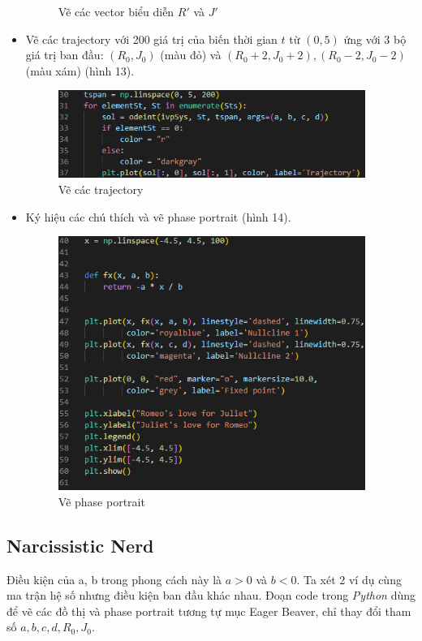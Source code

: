 \begin{itemize}
\begin{figure}[h!]
\begin{center}
        \end{center}
        \caption{Vẽ các vector biểu diễn $R'$ và $J'$}
    \end{figure}
    \item Vẽ các trajectory với 200 giá trị của biến thời gian $t$ từ $(0, 5)$ ứng với 3 bộ giá trị ban đầu: $(R_0, J_0)$ (màu đỏ) và $(R_0 + 2, J_0 + 2), (R_0 - 2, J_0 - 2)$ (màu xám) (hình 13).
    \begin{figure}[h!]
        \begin{center}
        \includegraphics[width=10cm]{images/plot_odeint.png}
        \end{center}
        \caption{Vẽ các trajectory}
    \end{figure}
    \item Ký hiệu các chú thích và vẽ phase portrait (hình 14).
    \begin{figure}[h!]
        \begin{center}
        \includegraphics[width=10cm]{images/phase_portrait.png}
        \end{center}
        \caption{Vẽ phase portrait}
    \end{figure}
\end{itemize}
\subsection{Narcissistic Nerd}
Điều kiện của a, b trong phong cách này là $a > 0$ và $b < 0$. Ta xét 2 ví dụ cùng ma trận hệ số nhưng điều kiện ban đầu khác nhau. Đoạn code trong \textit{Python} dùng để vẽ các đồ thị và phase portrait tương tự mục Eager Beaver, chỉ thay đổi tham số $a, b, c, d, R_0, J_0$.
